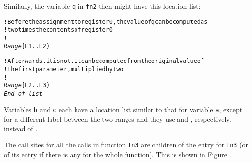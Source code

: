 \vspace*{0.7\baselineskip}
Similarly, the variable \texttt{q} in \texttt{fn2} then might have this location list:

\begin{dwflisting}
\begin{alltt}

    ! Before the assignment to register 0, the value of q can be computed as 
    ! two times the contents of register 0
    !
    \textit{Range} [L1 .. L2)
        \DWOPlittwo {} \DWOPmul \DWOPstackvalue

    ! Afterwards. it is not. It can be computed from the original value of 
    ! the first parameter, multiplied by two
    !
    \textit{Range} [L2 .. L3)
        \DWOPlittwo {} \DWOPregzero \DWOPmul \DWOPstackvalue
    \textit{End-of-list}

\end{alltt}
\end{dwflisting}

\vspace*{0.7\baselineskip}
Variables \texttt{b} and \texttt{c} each have a location list similar to 
that for variable \texttt{a},
except for a different label between the two ranges and they
use \DWOPregone{} and \DWOPregtwo{}, respectively, instead of \DWOPregzero.


The call sites for all the calls in function \texttt{fn3} are children of the
\DWTAGsubprogram{} entry for \texttt{fn3} (or of its \DWTAGlexicalblock{} entry
if there is any for the whole function). 
This is shown in Figure .

